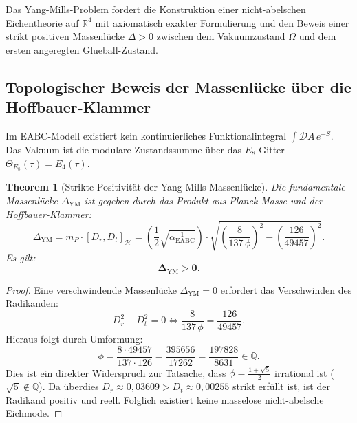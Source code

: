 \documentclass[11pt,a4paper]{article}
\newtheorem{theorem}{Theorem}[section]
\theoremstyle{definition}
\theoremstyle{remark}
\numberwithin{equation}{section}
\begin{document}
Das Yang-Mills-Problem fordert die Konstruktion einer nicht-abelschen Eichentheorie auf $\mathbb{R}^4$ mit axiomatisch exakter Formulierung und den Beweis einer strikt positiven Massenlücke $\Delta > 0$ zwischen dem Vakuumzustand $\Omega$ und dem ersten angeregten Glueball-Zustand.

\subsection{Topologischer Beweis der Massenlücke über die Hoffbauer-Klammer}

Im EABC-Modell existiert kein kontinuierliches Funktionalintegral $\int \mathcal{D}A \, e^{-S}$. Das Vakuum ist die modulare Zustandssumme über das $E_8$-Gitter $\Theta_{E_8}(\tau) = E_4(\tau)$. 

\begin{theorem}[Strikte Positivität der Yang-Mills-Massenlücke]
Die fundamentale Massenlücke $\Delta_{\mathrm{YM}}$ ist gegeben durch das Produkt aus Planck-Masse und der Hoffbauer-Klammer:
\begin{equation}
\Delta_{\mathrm{YM}} = m_P \cdot [D_r, D_t]_{\mathcal{H}} = \left(\frac{1}{2}\sqrt{\alpha^{-1}_{\mathrm{EABC}}}\right) \cdot \sqrt{\left(\frac{8}{137\,\phi}\right)^2 - \left(\frac{126}{49457}\right)^2}.
\end{equation}
Es gilt:
\begin{equation}
\mathbf{\Delta_{\mathrm{YM}} > 0}.
\end{equation}
\end{theorem}

\begin{proof}
Eine verschwindende Massenlücke $\Delta_{\mathrm{YM}} = 0$ erfordert das Verschwinden des Radikanden:
\begin{equation}
D_r^2 - D_t^2 = 0 \iff \frac{8}{137\,\phi} = \frac{126}{49457}.
\end{equation}
Hieraus folgt durch Umformung:
\begin{equation}
\phi = \frac{8 \cdot 49457}{137 \cdot 126} = \frac{395656}{17262} = \frac{197828}{8631} \in \mathbb{Q}.
\end{equation}
Dies ist ein direkter Widerspruch zur Tatsache, dass $\phi = \frac{1+\sqrt{5}}{2}$ irrational ist ($\sqrt{5} \notin \mathbb{Q}$).
Da überdies $D_r \approx 0{,}03609 > D_t \approx 0{,}00255$ strikt erfüllt ist, ist der Radikand positiv und reell. Folglich existiert keine masselose nicht-abelsche Eichmode.
\end{proof}
\end{document}
